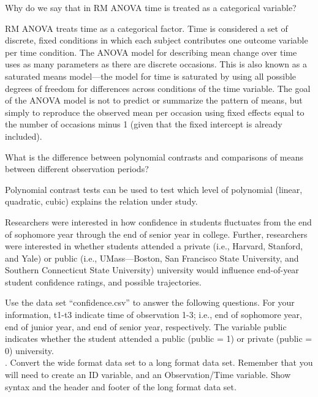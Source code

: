 \documentclass[onecolumn,10pt]{jhwhw}
\begin{document}
\problem{}
Why do we say that in RM ANOVA time is treated as a categorical variable?

RM ANOVA treats time as a categorical factor. Time is considered a set of discrete, fixed conditions in which each subject contributes one outcome variable per time condition. The ANOVA model for describing mean change over time uses as many parameters as there are discrete occasions. This is also known as a saturated means model---the model for time is saturated by using all possible degrees of freedom for differences across conditions of the time variable. The goal of the ANOVA model is not to predict or summarize the pattern of means, but simply to reproduce the observed mean per occasion using fixed effects equal to the number of occasions minus 1 (given that the fixed intercept is already included).

\problem{}
What is the difference between polynomial contrasts and comparisons of means between different observation periods?

Polynomial contrast tests can be used to test which level of polynomial (linear, quadratic, cubic) explains the relation under study.

\problem{}
Researchers were interested in how confidence in students fluctuates from the end of sophomore year through the end of senior year in college. Further, researchers were interested in whether students attended a private (i.e., Harvard, Stanford, and Yale) or public (i.e., UMass---Boston, San Francisco State University, and Southern Connecticut State University) university would influence end-of-year student confidence ratings, and possible trajectories.

Use the data set “confidence.csv” to answer the following questions. For your information, t1-t3 indicate time of observation 1-3; i.e., end of sophomore year, end of junior year, and end of senior year, respectively. The variable public indicates whether the student attended a public (public = 1) or private (public = 0) university.\\

. Convert the wide format data set to a long format data set. Remember that you will need to create an ID variable, and an Observation/Time variable. Show syntax and the header and footer of the long format data set.
\end{document}
